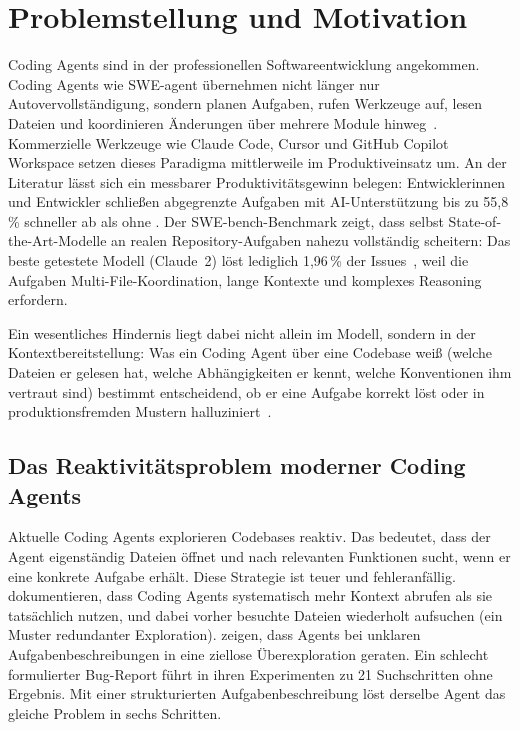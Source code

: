 \section{Problemstellung und Motivation}

Coding Agents sind in der professionellen Softwareentwicklung angekommen.
Coding Agents wie SWE-agent übernehmen nicht länger nur Autovervollständigung,
sondern planen Aufgaben, rufen Werkzeuge auf, lesen Dateien
und koordinieren Änderungen über mehrere Module hinweg~\parencite{yang2024sweagent}.
Kommerzielle Werkzeuge wie Claude Code, Cursor und GitHub Copilot Workspace
setzen dieses Paradigma mittlerweile im Produktiveinsatz um.
An der Literatur lässt sich ein messbarer Produktivitätsgewinn belegen:
Entwicklerinnen und Entwickler schließen abgegrenzte Aufgaben mit AI-Unterstützung
bis zu 55,8\,\% schneller ab als ohne \parencite{peng2023copilot}.
Der SWE-bench-Benchmark zeigt, dass selbst State-of-the-Art-Modelle
an realen Repository-Aufgaben nahezu vollständig scheitern:
Das beste getestete Modell (Claude~2) löst lediglich 1,96\,\% der Issues~\parencite{jimenez2024swebench},
weil die Aufgaben Multi-File-Koordination, lange Kontexte und komplexes Reasoning erfordern.

Ein wesentliches Hindernis liegt dabei nicht allein im Modell,
sondern in der Kontextbereitstellung:
Was ein Coding Agent über eine Codebase weiß
(welche Dateien er gelesen hat, welche Abhängigkeiten er kennt,
welche Konventionen ihm vertraut sind)
bestimmt entscheidend, ob er eine Aufgabe korrekt löst
oder in produktionsfremden Mustern halluziniert~\parencite{li2026contextbench}.

\subsection*{Das Reaktivitätsproblem moderner Coding Agents}

Aktuelle Coding Agents explorieren Codebases reaktiv.
Das bedeutet, dass der Agent eigenständig Dateien öffnet und nach relevanten Funktionen sucht,
wenn er eine konkrete Aufgabe erhält.
Diese Strategie ist teuer und fehleranfällig.
\Textcite{li2026contextbench} dokumentieren, dass Coding Agents systematisch
mehr Kontext abrufen als sie tatsächlich nutzen,
und dabei vorher besuchte Dateien wiederholt aufsuchen
(ein Muster redundanter Exploration).
\Textcite{suri2026codescout} zeigen, dass Agents bei unklaren Aufgabenbeschreibungen
in eine ziellose Überexploration geraten.
Ein schlecht formulierter Bug-Report führt in ihren Experimenten
zu 21 Suchschritten ohne Ergebnis.
Mit einer strukturierten Aufgabenbeschreibung löst derselbe Agent
das gleiche Problem in sechs Schritten.

